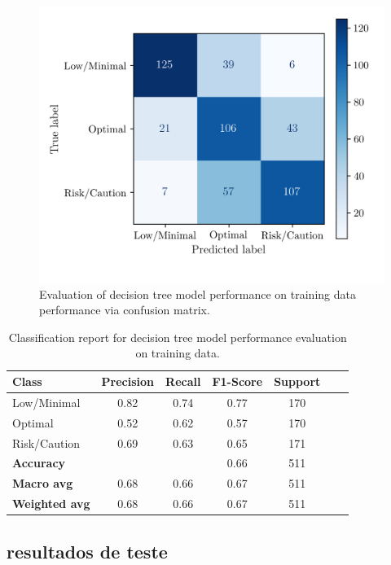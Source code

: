 \documentclass[conference]{IEEEtran}
\begin{document}
\begin{figure}[H]
    \centering
    \includegraphics[width=1\linewidth]{assets/DTREE_ConfusionMatrixTrain.png}
    \caption{Evaluation of decision tree model performance on training data performance via confusion matrix.}
    \label{dtree_cmtrain}
\end{figure}

\begin{table}[H]
\centering
\caption{Classification report for decision tree model performance evaluation on training data.}
\begin{tabular}{lcccccc}
\toprule
\textbf{Class} & \textbf{Precision} & \textbf{Recall} & \textbf{F1-Score} & \textbf{Support} \\
\midrule
Low/Minimal & 0.82 & 0.74 & 0.77 & 170 \\
Optimal & 0.52 & 0.62 & 0.57 & 170 \\
Risk/Caution & 0.69 & 0.63 & 0.65 & 171 \\
\midrule
\textbf{Accuracy} &  &  & 0.66 & 511 \\
\textbf{Macro avg} & 0.68 & 0.66 & 0.67 & 511 \\
\textbf{Weighted avg} & 0.68 & 0.66 & 0.67 & 511 \\
\bottomrule
\end{tabular}
\end{table}

\subsection{resultados de teste}
\end{document}
